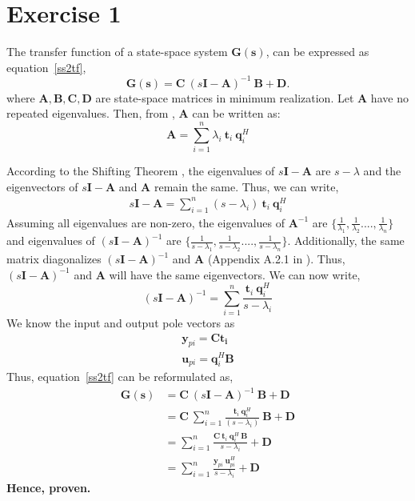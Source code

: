 \section{Exercise 1}
The transfer function of a state-space system $\mathbf{G(s)}$, can be expressed as equation~\eqref{ss2tf},
\begin{equation}
 \bm{G(s)} = \bm{C} \: (s\bm{I} - \bm{A})^{-1} \: \bm{B} + \bm{D} \text{.}
  \label{ss2tf}
\end{equation}
where $\bm{A}, \bm{B}, \bm{C}, \bm{D}$  are state-space matrices in minimum realization. Let $\bm{A}$  have no repeated eigenvalues. Then, from \cite{Sko05}, $\bm{A}$ can be written as:
\begin{equation}
\bm{A} = \sum_{i=1}^n \lambda_i \: \bm{t}_i\: \bm{q}_i^H 
\label{specDec1}
\end{equation}

According to the Shifting Theorem \cite{Bha12}, the eigenvalues of $s\bm{I}-\bm{A}$ are $s-\lambda$ and the eigenvectors of $s\bm{I}-\bm{A}$ and $\bm{A}$ remain the same. Thus, we can write,
\begin{align*}
  s\bm{I} - \bm{A} = \sum_{i=1}^n (s - \lambda_i) \: \bm{t}_i\: \bm{q}_i^H   
\end{align*}
    Assuming all eigenvalues are non-zero, the eigenvalues of $\bm{A}^{-1}$ are $\{\frac{1}{\lambda_1},\frac{1}{\lambda_2}....,\frac{1}{\lambda_n}\}$ and eigenvalues of $(s\bm{I} - \bm{A})^{-1}$ are $\{\frac{1}{s-\lambda_1},\frac{1}{s-\lambda_2}....,\frac{1}{s-\lambda_n}\}$. Additionally, the same matrix diagonalizes $(s\bm{I} - \bm{A})^{-1}$ and $\bm{A}$ (Appendix A.2.1 in \cite{Sko05}). Thus, $(s\bm{I} - \bm{A})^{-1}$ and $\bm{A}$ will have the same eigenvectors. We can now write,
\begin{equation}
(s\bm{I} - \bm{A})^{-1} = \sum_{i=1}^n \frac{\bm{t}_i\: \bm{q}_i^H}{s - \lambda_i} 
\label{specDec2}
\end{equation}
We know the input and output pole vectors as
\begin{align*}
\bm{y}_{pi} = \bm{C}\bm{t_i} \\
\bm{u}_{pi}= \bm{q}_{i}^H\bm{B} 
\end{align*}
Thus, equation~\eqref{ss2tf} can be reformulated as,
\begin{align*}
\bm{G(s)} &=  \bm{C} \: (s\bm{I} - \bm{A})^{-1} \: \bm{B} + \bm{D} \\
	&= \bm{C}\: \sum_{i=1}^n \frac{\bm{t}_i\: \bm{q}_i^H}{(s - \lambda_i)}\: \bm{B} + \bm{D} \\
	&= \sum_{i=1}^n \frac{\bm{C}\: \bm{t}_i\: \bm{q}_i^H\: \bm{B}}{s - \lambda_i} + \bm{D} \\
    &= \sum_{i=1}^n \frac{\bm{y}_{pi}\: \bm{u}_{pi}^H}{s - \lambda_i} + \bm{D} 
\end{align*}
\textbf{Hence, proven.}


